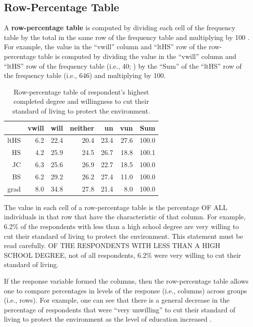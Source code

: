 \documentclass[10pt,openany]{book}\usepackage[]{graphicx}\usepackage[]{color}
\begin{document}
\subsection{Row-Percentage Table}
A \textbf{row-percentage table} is computed by dividing each cell of the frequency table by the total in the same row of the frequency table and multiplying by 100 . For example, the value in the ``vwill'' column and ``ltHS'' row of the row-percentage table is computed by dividing the value in the ``vwill'' column and ``ltHS'' row of the frequency table (i.e., 40; ) by the ``Sum'' of the ``ltHS'' row of the frequency table (i.e., 646) and multiplying by 100.

\begin{table}[ht]
\centering
\caption{Row-percentage table of respondent's highest completed degree and willingness to cut their standard of living to protect the environment.} 
\label{tab:EnvRowP}
\begin{tabular}{rrrrrrr}
  \hline
 & vwill & will & neither & un & vun & Sum \\ 
  \hline
ltHS & 6.2 & 22.4 & 20.4 & 23.4 & 27.6 & 100.0 \\ 
  HS & 4.2 & 25.9 & 24.5 & 26.7 & 18.8 & 100.1 \\ 
  JC & 6.3 & 25.6 & 26.9 & 22.7 & 18.5 & 100.0 \\ 
  BS & 6.2 & 29.2 & 26.2 & 27.4 & 11.0 & 100.0 \\ 
  grad & 8.0 & 34.8 & 27.8 & 21.4 & 8.0 & 100.0 \\ 
   \hline
\end{tabular}
\end{table}


The value in each cell of a row-percentage table is the percentage OF ALL individuals in that row that have the characteristic of that column. For example, 6.2\% of the respondents with less than a high school degree are very willing to cut their standard of living to protect the environment. This statement must be read carefully. OF THE RESPONDENTS WITH LESS THAN A HIGH SCHOOL DEGREE, not of all respondents, 6.2\% were very willing to cut their standard of living.

If the response variable formed the columns, then the row-percentage table  allows one to compare percentages in levels of the response (i.e., columns) across groups (i.e., rows). For example, one can see that there is a general decrease in the percentage of respondents that were ``very unwilling'' to cut their standard of living to protect the environment as the level of education increased .
\end{document}
